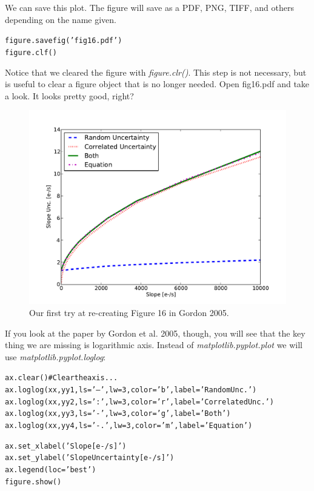 We can save this plot.  The figure will save as a PDF, PNG, TIFF, and
others depending on the name given.

\begin{alltt}
\pytab figure.savefig('fig16.pdf')
\pytab figure.clf()
\end{alltt}

Notice that we cleared the figure with \textit{figure.clr()}. This step is not 
necessary, but is useful to clear a figure object that is no longer needed. 
Open fig16.pdf and take a look.  It looks pretty good, right?

\begin{figure}[tbp]
  \centering
    \includegraphics[scale=0.55]{splot.pdf}
    \caption{Our first try at re-creating Figure 16 in Gordon 2005.}
  \label{fig:splot}
\end{figure}

If you look at the paper by
Gordon et al. 2005, though, you will see that the key thing we are missing is
logarithmic axis.  Instead of \textit{matplotlib.pyplot.plot} we will use \textit{matplotlib.pyplot.loglog}:

\begin{alltt}
\pytab ax.clear()      # Clear the axis...
\pytab ax.loglog(xx, yy1, ls='--', lw=3, color='b', label='Random Unc.')
\pytab ax.loglog(xx, yy2, ls=':', lw=3, color='r', label='Correlated Unc.')
\pytab ax.loglog(xx, yy3, ls='-', lw=3, color='g', label='Both')
\pytab ax.loglog(xx, yy4, ls='-.', lw=3, color='m', label='Equation')

\pytab ax.set_xlabel('Slope [e-/s]')
\pytab ax.set_ylabel('Slope Uncertainty [e-/s]')
\pytab ax.legend(loc='best')
\pytab figure.show()
\end{alltt}

